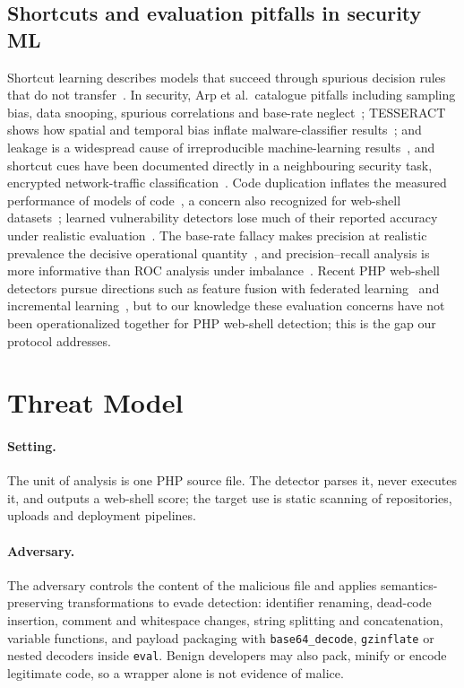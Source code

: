 \documentclass[pdflatex,sn-mathphys-num]{sn-jnl}
\begin{document}
\subsection{Shortcuts and evaluation pitfalls in security ML}
Shortcut learning describes models that succeed through spurious decision
rules that do not transfer~\cite{geirhos2020shortcut}. In security, Arp et al.\
catalogue pitfalls including sampling bias, data snooping, spurious
correlations and base-rate neglect~\cite{arp2022dos}; TESSERACT shows how
spatial and temporal bias inflate malware-classifier
results~\cite{pendlebury2019tesseract}; and leakage is a widespread cause of
irreproducible machine-learning results~\cite{kapoor2023leakage}, and shortcut
cues have been documented directly in a neighbouring security task, encrypted
network-traffic classification~\cite{wang2026shortcuttraffic}. Code
duplication inflates the measured performance of models of
code~\cite{allamanis2019duplication}, a concern also recognized for web-shell
datasets~\cite{hannousse2022webshell}; learned vulnerability detectors lose
much of their reported accuracy under realistic
evaluation~\cite{chakraborty2022deep,risse2024limits}. The base-rate fallacy
makes precision at realistic prevalence the decisive operational
quantity~\cite{axelsson2000base}, and precision--recall analysis is more
informative than ROC analysis under imbalance~\cite{saito2015prc}. Recent
PHP web-shell detectors pursue directions such as feature fusion with federated
learning~\cite{zeng2025webshell} and incremental learning~\cite{wang2025incremental},
but to our knowledge these evaluation concerns have not been operationalized
together for PHP web-shell detection; this is the gap our protocol addresses.

\section{Threat Model}\label{sec:threat}
\paragraph{Setting.} The unit of analysis is one PHP source file. The detector
parses it, never executes it, and outputs a web-shell score; the target use is
static scanning of repositories, uploads and deployment pipelines.

\paragraph{Adversary.} The adversary controls the content of the malicious
file and applies semantics-preserving transformations to evade detection:
identifier renaming, dead-code insertion, comment and whitespace changes,
string splitting and concatenation, variable functions, and payload packaging
with \texttt{base64\_decode}, \texttt{gzinflate} or nested decoders inside
\texttt{eval}. Benign developers may also pack, minify or encode legitimate
code, so a wrapper alone is not evidence of malice.
\end{document}

